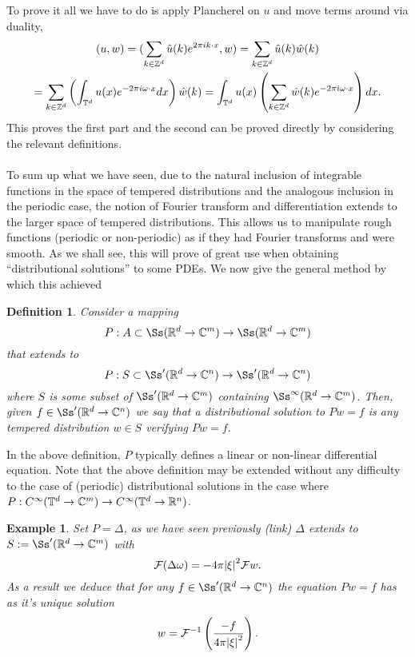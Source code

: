 \documentclass[12pt]{article}
\newtheorem{definition}{Definition}
\newtheorem{example}{Example}
\begin{document}
To prove it all we have to do is apply Plancherel on $u$ and move terms around via duality,
\begin{multline*}
	(u,w)=(\sum_{k\in {\mathbb Z}^d}\hat{u}(k)e^{2\pi ik\cdot x},w )=\sum_{k\in {\mathbb Z}^d}  \hat{u}(k)\hat{w}(k)\\=\sum_{k\in {\mathbb Z}^d}  \left(\int_{{\mathbb T}^d} u(x)e^{-2\pi i\omega\cdot  x}dx\right)\hat{w}(k)=\int_{{\mathbb T}^d} u(x)\left(\sum_{k\in {\mathbb Z}^d} \hat{w}(k) e^{-2\pi i\omega\cdot  x}\right)dx.
\end{multline*}
This proves the first part and the second can be proved directly by considering the relevant definitions.\\
\\
To sum up what we have seen, due to the natural inclusion of integrable functions in the space of tempered distributions and the analogous inclusion in the periodic case, the notion of Fourier transform and differentiation extends to the larger space of tempered distributions. This allows us to manipulate rough functions (periodic or non-periodic) as if they had Fourier transforms and were smooth. As we shall see, this will prove of great use when obtaining ``distributional solutions'' to some PDEs. We now give the general method by which this achieved
\begin{definition}
	Consider a mapping
	\[P:A\subset\Ss(\R^d\to\C^m)\to \Ss(\R^d\to\C^m)\]
	that extends to
	\[P:S\subset \Ss'(\R^d\to\C^n)\to \Ss'(\R^d\to\C^n)\]
	where $S$  is some subset of ${\Ss'}(\R^d\to\C^m)$ containing $\Ss^\infty(\R^d\to\C^m)$. Then, given $f \in \Ss'(\R^d\to \C^n)$ we say that a \emph{distributional solution} to $Pw=f$ is any tempered distribution $w\in S$ verifying
	$Pw=f$.
\end{definition}
In the above definition, $P$ typically defines a linear or non-linear differential equation. Note that the above definition may be extended without any difficulty to the case of (periodic) distributional solutions in the case where $P: C^\infty({\mathbb T}^d\to\mathbb{C}^m)\to C^\infty({\mathbb T}^d\to{\mathbb R}^n)$.
\begin{example}
	Set $P=\Delta $, as we have seen previously (link) $\Delta$ extends to $S:=\Ss'(\R^d\to\C^m)$ with
	\begin{equation*}
		\mathcal{F}(\Delta \omega)=-4\pi \abs{\xi }^2\mathcal{F} w .
	\end{equation*}
	As a result we deduce that for any $f \in \Ss'(\R^d\to \C^n)$ the equation $Pw=f$ has as it's unique solution
	\begin{equation*}
		w=\mathcal{F}^{-1}\left(\frac{-f}{4\pi \abs{\xi }^2 }\right).
	\end{equation*}
\end{example}
\end{document}
